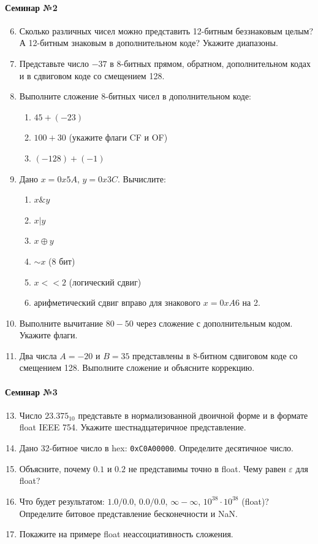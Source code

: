 \documentclass[a4paper,14pt]{report}
\begin{document}
\paragraph{Семинар №2}
\begin{enumerate}
    \setcounter{enumi}{5}
    \item Сколько различных чисел можно представить 12-битным беззнаковым целым? А 12-битным знаковым в дополнительном коде? Укажите диапазоны.
    \item Представьте число $-37$ в 8-битных прямом, обратном, дополнительном кодах и в сдвиговом коде со смещением 128.
    \item Выполните сложение 8-битных чисел в дополнительном коде:
    \begin{enumerate}
        \item $45 + (-23)$
        \item $100 + 30$ (укажите флаги CF и OF)
        \item $(-128) + (-1)$
    \end{enumerate}
    \item Дано $x = 0x5A$, $y = 0x3C$. Вычислите:
    \begin{enumerate}
        \item $x \& y$
        \item $x | y$
        \item $x \oplus y$
        \item $\sim x$ (8 бит)
        \item $x << 2$ (логический сдвиг)
        \item арифметический сдвиг вправо для знакового $x = 0xA6$ на 2.
    \end{enumerate}
    \item Выполните вычитание $80 - 50$ через сложение с дополнительным кодом. Укажите флаги.
    \item Два числа $A=-20$ и $B=35$ представлены в 8-битном сдвиговом коде со смещением 128. Выполните сложение и объясните коррекцию.
\end{enumerate}

\paragraph{Семинар №3}
\begin{enumerate}
    \setcounter{enumi}{12}
    \item Число $23.375_{10}$ представьте в нормализованной двоичной форме и в формате float IEEE 754. Укажите шестнадцатеричное представление.
    \item Дано 32-битное число в hex: \texttt{0xC0A00000}. Определите десятичное число.
    \item Объясните, почему $0.1$ и $0.2$ не представимы точно в float. Чему равен $\varepsilon$ для float?
    \item Что будет результатом: $1.0/0.0$, $0.0/0.0$, $\infty-\infty$, $10^{38}\cdot10^{38}$ (float)? Определите битовое представление бесконечности и NaN.
    \item Покажите на примере float неассоциативность сложения.
\end{enumerate}
\end{document}
